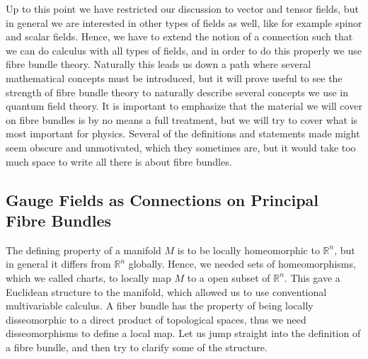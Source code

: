 \medskip
Up to this point we have restricted our discussion to vector and tensor fields, but in general we are interested in other types of fields as well, like for example spinor and scalar fields. Hence, we have to extend the notion of a connection such that we can do calculus with all types of fields, and in order to do this properly we use fibre bundle theory. Naturally this leads us down a path where several mathematical concepts must be introduced, but it will prove useful to see the strength of fibre bundle theory to naturally describe several concepts we use in quantum field theory. It is important to emphasize that the material we will cover on fibre bundles is by no means a full treatment, but we will try to cover what is most important for physics. Several of the definitions and statements made might seem obscure and unmotivated, which they sometimes are, but it would take too much space to write all there is about fibre bundles. 

\subsection{Gauge Fields as Connections on Principal Fibre Bundles}\label{sec:basics in fibre bundle theory}
The defining property of a manifold $M$ is to be locally homeomorphic to $\mathbb{R}^{n}$, but in general it differs from $\mathbb{R}^{n}$ globally. Hence, we needed sets of homeomorphisms, which we called charts, to locally map $M$ to a open subset of $\mathbb{R}^{n}$. This gave a Euclidean structure to the manifold, which allowed us to use conventional multivariable calculus. A fiber bundle has the property of being locally disseomorphic to a direct product of topological spaces, thus we need disseomorphisms to define a local map. Let us jump straight into the definition of a fibre bundle, and then try to clarify some of the structure.

